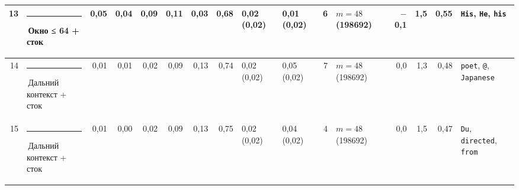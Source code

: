 \documentclass[10pt]{article}
\begin{document}
\begin{minipage}{\linewidth}
\begin{center}
{\begin{tabular}{|r|l|r|r|r|r|r|r|l|l|r|l|r|r|r|l|}
13 & \textcolor[HTML]{EDA100}{\rule{0.62em}{0.62em}}\,\textbf{Окно ≤ 64 + сток} & 0,05 & 0,04 & 0,09 & 0,11 & 0,03 & 0,68 & 0,02 (0,02) & 0,01 (0,02) & 6 & $m{=}48$ (198692) & $-$0,1 & 1,5 & 0,55 & \texttt{\textvisiblespace{}His}, \texttt{\textvisiblespace{}He}, \texttt{\textvisiblespace{}his} \\ \hline
14 & \textcolor[HTML]{C3C2B7}{\rule{0.62em}{0.62em}}\,Дальний контекст + сток & 0,01 & 0,01 & 0,02 & 0,09 & 0,13 & 0,74 & 0,02 (0,02) & 0,05 (0,02) & 7 & $m{=}48$ (198692) & 0,0 & 1,3 & 0,48 & \texttt{\textvisiblespace{}poet}, \texttt{\textvisiblespace{}@}, \texttt{\textvisiblespace{}Japanese} \\ \hline
15 & \textcolor[HTML]{C3C2B7}{\rule{0.62em}{0.62em}}\,Дальний контекст + сток & 0,01 & 0,00 & 0,02 & 0,09 & 0,13 & 0,75 & 0,02 (0,02) & 0,04 (0,02) & 4 & $m{=}48$ (198692) & 0,0 & 1,5 & 0,47 & \texttt{\textvisiblespace{}Du}, \texttt{\textvisiblespace{}directed}, \texttt{\textvisiblespace{}from} \\ \hline
\hline\end{tabular}}\end{center}
\end{minipage}
\par\vspace{0.4em}
\end{document}
